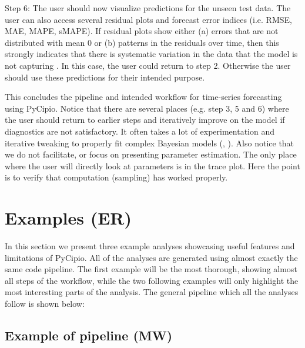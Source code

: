 \documentclass{article}
\begin{document}
\noindent Step 6: The user should now visualize predictions for the unseen test data. The user can also access several residual plots and forecast error indices (i.e. RMSE, MAE, MAPE, sMAPE). If residual plots show either (a) errors that are not distributed with mean 0 or (b) patterns in the residuals over time, then this strongly indicates that there is systematic variation in the data that the model is not capturing \cite{fpp3}. In this case, the user could return to step 2. Otherwise the user should use these predictions for their intended purpose. 

\noindent This concludes the pipeline and intended workflow for time-series forecasting using PyCipio. Notice that there are several places (e.g. step 3, 5 and 6) where the user should return to earlier steps and iteratively improve on the model if diagnostics are not satisfactory. It often takes a lot of experimentation and iterative tweaking to properly fit complex Bayesian models (, ). Also notice that we do not facilitate, or focus on presenting parameter estimation. The only place where the user will directly look at parameters is in the trace plot. Here the point is to verify that computation (sampling) has worked properly. 

\section{Examples (ER)}

\noindent In this section we present three example analyses showcasing useful features and limitations of PyCipio. All of the analyses are generated using almost exactly the same code pipeline. The first example will be the most thorough, showing almost all steps of the workflow, while the two following examples will only highlight the most interesting parts of the analysis. The general pipeline which all the analyses follow is shown below: 

\subsection{Example of pipeline (MW)}

\lstset{frame=lines}
\end{document}
